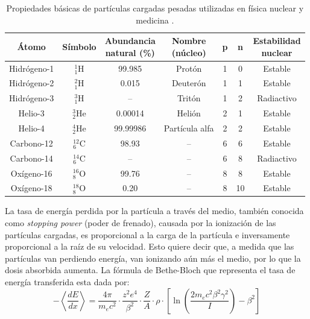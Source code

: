 \documentclass[onecolumn,12pt]{article} %
\begin{document}
\begin{table}[H]
\centering
\begin{tabular}{c c c c c c c}
\toprule
\textbf{Átomo} & \textbf{Símbolo} & \shortstack{ \textbf{Abundancia}\\ \textbf{natural (\%)}} & \shortstack{ \textbf{Nombre}\\ \textbf{(núcleo)}} &
\textbf{p} &
\textbf{n} &
\shortstack{ \textbf{Estabilidad}\\ \textbf{nuclear}} \\
\midrule
\hline
Hidrógeno-1 & \( ^1_1\text{H} \) & 99.985 & Protón & 1 & 0 & Estable \\
Hidrógeno-2 & \( ^2_1\text{H} \) & 0.015 & Deuterón & 1 & 1 & Estable \\
Hidrógeno-3 & \( ^3_1\text{H} \) & – & Tritón & 1 & 2 & Radiactivo \\
Helio-3     & \( ^3_2\text{He} \) & 0.00014 & Helión & 2 & 1 & Estable \\
Helio-4     & \( ^4_2\text{He} \) & 99.99986 & Partícula alfa & 2 & 2 & Estable \\
Carbono-12  & \( ^{12}_6\text{C} \) & 98.93 & – & 6 & 6 & Estable \\
Carbono-14  & \( ^{14}_6\text{C} \) & – & – & 6 & 8 & Radiactivo \\
Oxígeno-16  & \( ^{16}_8\text{O} \) & 99.76 & – & 8 & 8 & Estable \\
Oxígeno-18  & \( ^{18}_8\text{O} \) & 0.20 & – & 8 & 10 & Estable \\
\bottomrule
\end{tabular}
\caption{Propiedades básicas de partículas cargadas pesadas utilizadas en física nuclear y medicina \cite{podgorsak2022}.}
\end{table}

La tasa de energía perdida por la partícula a través del medio, también conocida como \textit{stopping power} (poder de frenado), causada por la ionización de las partículas cargadas, es proporcional a  la carga de la partícula e inversamente proporcional a la raíz de su velocidad. Esto quiere decir que, a medida que las partículas van perdiendo energía, van ionizando aún más el medio, por lo que la dosis absorbida aumenta. La fórmula de Bethe-Bloch que representa el tasa de energía transferida esta dada por:
\begin{equation}
- \left\langle \frac{dE}{dx} \right\rangle = \frac{4\pi}{m_e c^2} \cdot \frac{z^2 e^4}{\beta^2} \cdot \frac{Z}{A} \cdot \rho \cdot \left[ \ln\left( \frac{2 m_e c^2 \beta^2 \gamma^2}{I} \right) - \beta^2 \right]
\label{ecu:poderdefrenado}
\end{equation}
\end{document}
